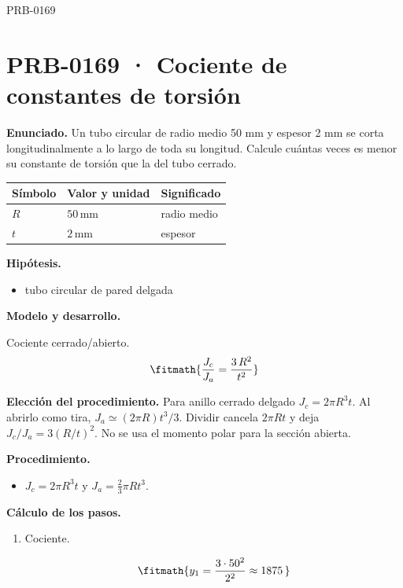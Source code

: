\begin{studiumworked}{PRB-0169}

\section{PRB-0169 · Cociente de constantes de torsión}

\textbf{Enunciado.} Un tubo circular de radio medio 50 mm y espesor 2 mm se corta longitudinalmente a lo largo de toda su longitud. Calcule cuántas veces es menor su constante de torsión que la del tubo cerrado.

\par\medskip\noindent\begin{tabular}{@{}p{.18\linewidth}p{.26\linewidth}p{.48\linewidth}@{}}
\toprule Símbolo & Valor y unidad & Significado\\\midrule
$R$ & $50\,\mathrm{mm}$ & radio medio\\
$t$ & $2\,\mathrm{mm}$ & espesor\\
\bottomrule\end{tabular}\par\medskip

\textbf{Hipótesis.}\begin{itemize}\item tubo circular de pared delgada\end{itemize}

\textbf{Modelo y desarrollo.}

Cociente cerrado/abierto.\[\fitmath{\frac{J_c}{J_a} = \frac{3\,R^{2}}{t^{2}}}\]

\textbf{Elección del procedimiento.} Para anillo cerrado delgado $J_c=2\pi R^3t$. Al abrirlo como tira, $J_a\simeq(2\pi R)t^3/3$. Dividir cancela $2\pi Rt$ y deja $J_c/J_a=3(R/t)^2$. No se usa el momento polar para la sección abierta.

\textbf{Procedimiento.}\begin{itemize}\item $J_c = 2\pi R^3 t$ y $J_a = \tfrac{2}{3}\pi R t^3$.\end{itemize}

\textbf{Cálculo de los pasos.}

\begin{enumerate}

\item Cociente.

\[\fitmath{y_{1}=\frac{3\cdot {50}^{2}}{{2}^{2}}\approx 1875\,}\]

\end{enumerate}


\end{studiumworked}
